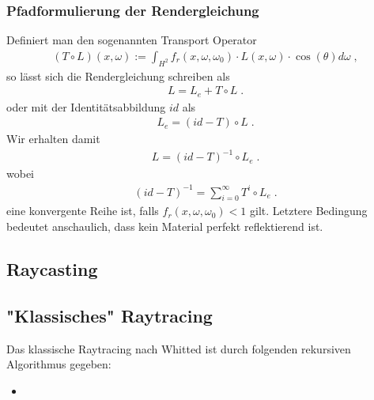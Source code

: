 \subsubsection{Pfadformulierung der Rendergleichung}
Definiert man den sogenannten Transport  Operator
\begin{align}
(T \circ  L)(x, \omega) :=  \displaystyle \int_{H^2}f_r (x, \omega, \omega_0) \cdot L(x, \omega)  \cdot  \cos(\theta) d\omega \; ,
\end{align}
so lässt sich die Rendergleichung schreiben als
\begin{align}
L = L_e + T \circ L \; .
\end{align}
oder mit der Identitätsabbildung $id$ als
\begin{align}
L_e = (id - T) \circ L \; .
\end{align}
Wir erhalten damit 
\begin{align}
L = (id - T)^{-1} \circ L_e \; .
\end{align}
wobei 
\begin{align}
 (id - T)^{-1}= \sum_{i= 0}^{\infty} T^i \circ L_e \; .
\end{align}
eine konvergente Reihe ist, falls $f_r (x, \omega, \omega_0) < 1$ gilt. Letztere Bedingung bedeutet anschaulich,  dass kein Material perfekt reflektierend ist.
 
\subsection{Raycasting}
\subsection{"Klassisches" Raytracing}
Das klassische Raytracing nach Whitted ist durch folgenden rekursiven Algorithmus gegeben:
\begin{itemize}
\item 
\end{itemize}

